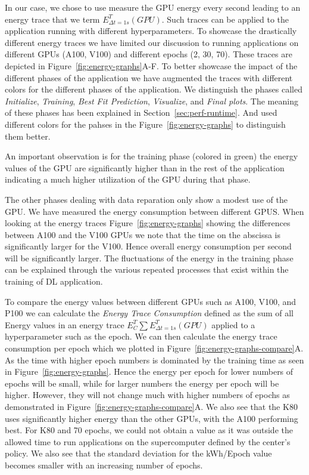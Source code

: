 \documentclass[utf8]{FrontiersinVancouver} %
\newcommand{\TODO}[2]{\todo[inline]{{\bf \color{red} #1} #2}}
\begin{document}
In our case, we chose to use measure the GPU energy every second
leading to an energy trace that we term $E^T_{\Delta t=1s}(GPU)$. Such
traces can be applied to the application running with different
hyperparameters. To showcase the drastically different energy traces
we have limited our discussion to running applications on different
GPUs (A100, V100) and different epochs (2, 30, 70). These traces are
depicted in Figure~\ref{fig:energy-graphs}A-F.  To better showcase the
impact of the different phases of the application we have augmented
the traces with different colors for the different phases of the
application.  We distinguish the phases called {\em Initialize}, {\em
  Training}, {\em Best Fit Prediction}, {\em Visualize}, and {\em
  Final plots}. The meaning of these phases has been explained in
Section~\ref{sec:perf-runtime}. And used different colors for the
pahses in the Figure~\ref{fig:energy-graphs} to distinguish them
better.

An important observation is for the training phase (colored in green)
the energy values of the GPU are significantly higher than in the rest
of the application indicating a much higher utilization of the GPU
during that phase.

The other phases dealing with data reparation only show a modest use
of the GPU. We have measured the energy consumption between different
GPUS.  When looking at the energy traces
Figure~\ref{fig:energy-graphs} showing the differences between A100
and the V100 GPUs we note that the time on the abscissa is
significantly larger for the V100. Hence overall energy consumption
per second will be significantly larger. The fluctuations of the
energy in the training phase can be explained through the various
repeated processes that exist within the training of DL application.


To compare the energy values between different GPUs such as A100,
V100, and P100 we can calculate the {\em Energy Trace Consumption}
defined as the sum of all Energy values in an energy trace
$E^T_C \sum E^T_{\Delta t=1s}(GPU)$ applied to a hyperparameter such
as the epoch.  We can then calculate the energy trace consumption per
epoch which we plotted in Figure~\ref{fig:energy-graphs-compare}A.  As
the time with higher epoch numbers is dominated by the training time
as seen in Figure~\ref{fig:energy-graphs}.  Hence the energy per epoch
for lower numbers of epochs will be small, while for larger numbers
the energy per epoch will be higher. However, they will not change
much with higher numbers of epochs as demonstrated in
Figure~\ref{fig:energy-graphs-compare}A.  We also see that the K80
uses significantly higher energy than the other GPUs, with the A100
performing best. For K80 and 70 epochs, we could not obtain a value as
it was outside the allowed time to run applications on the
supercomputer defined by the center's policy.  We also see that the
standard deviation for the kWh/Epoch value becomes smaller with an
increasing number of epochs.
\end{document}
